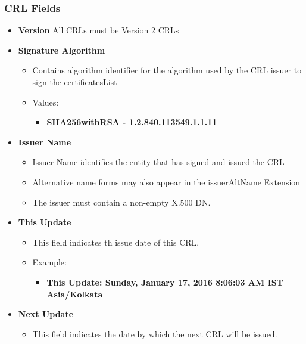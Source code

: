 \documentclass[12pt]{report}
\begin{document}
    \subsubsection{CRL Fields}
    \begin{itemize}
        \item \textbf{Version} All CRLs must be Version 2 CRLs
        \item \textbf{Signature Algorithm}
            \begin{itemize}
                \item Contains algorithm identifier for the algorithm used by the CRL issuer to sign the certificatesList
                \item Values:
                    \begin{itemize}
                        \item \textbf{SHA256withRSA - 1.2.840.113549.1.1.11}
                    \end{itemize}
            \end{itemize}
        \item \textbf{Issuer Name}
            \begin{itemize}
                \item Issuer Name identifies the entity that has signed and issued the CRL
                \item Alternative name forms may also appear in the issuerAltName Extension
                \item The issuer must contain a non-empty X.500 DN.
            \end{itemize}
        \item \textbf{This Update}
            \begin{itemize}
                \item This field indicates th issue date of this CRL. 
                \item Example:
                    \begin{itemize}
                        \item \textbf{This Update: Sunday, January 17, 2016 8:06:03 AM IST Asia/Kolkata}
                    \end{itemize}
            \end{itemize}
        \item \textbf{Next Update}
            \begin{itemize}
                \item This field indicates the date by which the next CRL will be issued. 

\end{itemize}
\end{itemize}
\end{document}
